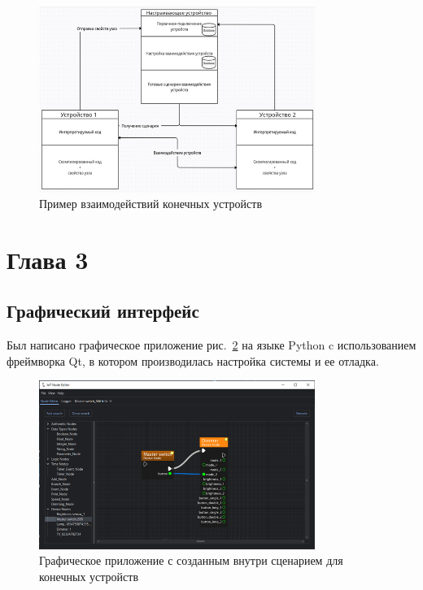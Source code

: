 \documentclass[a4paper,12pt]{article}
\begin{document}
\begin{figure}[h]
    \centering
    \includegraphics[width=0.8\textwidth]{images/Fig09.png}
    \caption{Пример взаимодействий конечных устройств}
    \label{fig:Connect_end_device_example}
\end{figure}


\newpage

\section{Глава 3}

\subsection{Графический интерфейс}
Был написано графическое приложение рис.~\ref{fig:GUI_base} на языке Python c использованием фреймворка Qt, в котором производилась настройка системы и ее отладка.

\begin{figure}[h]
    \centering
    \includegraphics[width=0.8\textwidth]{images/Fig11.png}
    \caption{Графическое приложение с созданным внутри сценарием для конечных устройств}
    \label{fig:GUI_base}
\end{figure}
\end{document}

